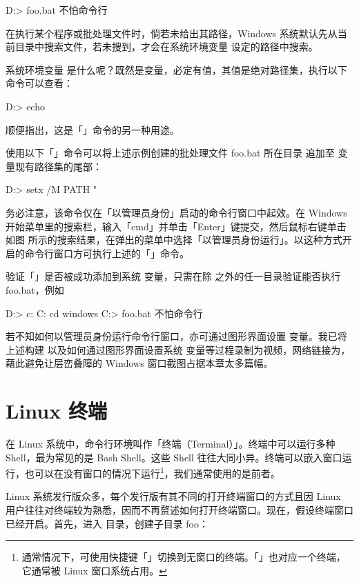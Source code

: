 {{{{\starttyping
D:\foo> foo.bat
不怕命令行
\stoptyping

\noindent 在执行某个程序或批处理文件时，倘若未给出其路径，Windows 系统默认先从当前目录中搜索文件，若未搜到，才会在系统环境变量  设定的路径中搜索。

系统环境变量  是什么呢？既然是变量，必定有值，其值是绝对路径集，执行以下命令可以查看：

\starttyping
D:\foo> echo %
\stoptyping

\noindent 顺便指出，这是「」命令的另一种用途。

使用以下「」命令可以将上述示例创建的批处理文件 foo.bat 所在目录  追加至  变量现有路径集的尾部：

\starttyping
D:\foo> setx /M PATH "%
\stoptyping

\noindent 务必注意，该命令仅在「以管理员身份」启动的命令行窗口中起效。在 Windows 开始菜单里的搜索栏，输入「cmd」并单击「Enter」键提交，然后鼠标右键单击如图 \in[search] 所示的搜索结果，在弹出的菜单中选择「以管理员身份运行」。以这种方式开启的命令行窗口方可执行上述的「」命令。

验证「」是否被成功添加到系统  变量，只需在除  之外的任一目录验证能否执行 foo.bat，例如

\starttyping
D:\foo> c:
C:\> cd windows  
C:\Windows{}> foo.bat
不怕命令行  
\stoptyping

若不知如何以管理员身份运行命令行窗口，亦可通过图形界面设置  变量。我已将上述构建  以及如何通过图形界面设置系统  变量等过程录制为视频，网络链接为，藉此避免让层峦叠障的 Windows 窗口截图占据本章太多篇幅。

\section{Linux 终端}

在 Linux 系统中，命令行环境叫作「终端（Terminal）」。终端中可以运行多种 Shell，最为常见的是 Bash Shell。这些 Shell 往往大同小异。终端可以嵌入窗口运行，也可以在没有窗口的情况下运行\footnote{通常情况下，可使用快捷键「」切换到无窗口的终端。「」也对应一个终端，它通常被 Linux 窗口系统占用。}，我们通常使用的是前者。

Linux 系统发行版众多，每个发行版有其不同的打开终端窗口的方式且因 Linux 用户往往对终端较为熟悉，因而不再赘述如何打开终端窗口。现在，假设终端窗口已经开启。首先，进入  目录，创建子目录 foo：

}}}}
